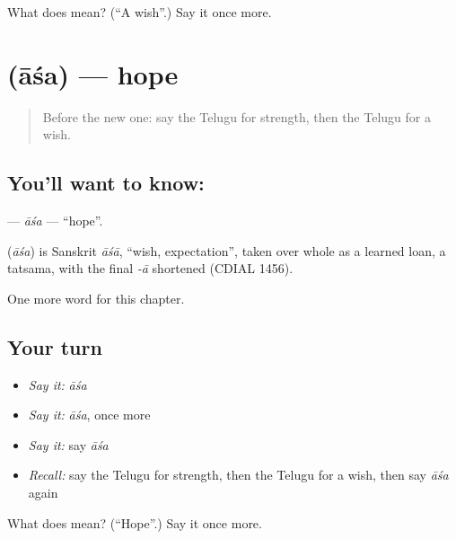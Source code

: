 \begin{tcolorbox}[breakable,colback=teal!4,colframe=teal!35!black,title={Before you move on}]
What does  mean? (\textquotedblleft{}A wish\textquotedblright{}.) Say it once more.
\end{tcolorbox}
\section[\texorpdfstring{\te{ఆశ} (āśa)}{ఆశ (āśa)}]{ (āśa) — hope}

\label{lesson:TE-C107-asa}



\begin{quote}
Before the new one: say the Telugu for strength, then the Telugu for a wish.
\end{quote}

\subsection*{You'll want to know: }
\textbf{} — \emph{āśa} — \textquotedblleft{}hope\textquotedblright{}.

\begin{cousinweb}
\textbf{} (\emph{āśa}) is Sanskrit \emph{āśā}, \textquotedblleft{}wish, expectation\textquotedblright{}, taken over whole as a learned loan, a tatsama, with the final \emph{-ā} shortened (CDIAL 1456).
\end{cousinweb}

\begin{grammarlens}[title={What you've built}]
One more word for this chapter.
\end{grammarlens}

\subsection*{Your turn}
\begin{itemize}
\raggedright
  \item \emph{Say it:} \emph{āśa}
  \item \emph{Say it:} \emph{āśa}, once more
  \item \emph{Say it:} say \emph{āśa}
  \item \emph{Recall:} say the Telugu for strength, then the Telugu for a wish, then say \emph{āśa} again
\end{itemize}

\begin{tcolorbox}[breakable,colback=teal!4,colframe=teal!35!black,title={Before you move on}]
What does  mean? (\textquotedblleft{}Hope\textquotedblright{}.) Say it once more.
\end{tcolorbox}
